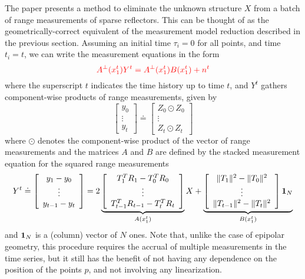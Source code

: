 \documentclass[]{article}
\newcommand{\ba}{\left[ \begin{array}}
\newcommand{\ea}{\end{array} \right]}
\begin{document}
The paper \cite{ferraraA09} presents a method to eliminate the unknown structure $X$ from a batch of range measurements of sparse reflectors. This can be thought of as the geometrically-correct equivalent of the measurement model reduction described in the previous section. Assuming an initial time $\tau_i = 0$ for all points, and time $t_i = t$, we can write the measurement equations in the form 
\begin{equation}
{\color{red}
A^\perp(x^t_1)Y^t = A^\perp(x_1^t) B(x_1^t) + n^t
}
\end{equation}
where the superscript $t$ indicates the time history up to time $t$, and $Y^t$ gathers component-wise products of range measurements, given by
\begin{equation}
\ba{c}
y_0 \\  \vdots \\ y_t \ea  \doteq  
\ba{c} 
Z_0 \odot Z_0  \\ 
\vdots \\ 
Z_t \odot Z_t \ea
\end{equation}
where $\odot$ denotes the component-wise product of the vector of range measurements and the matrices $A$ and $B$ are defined by the stacked measurement equation for the squared range measurements 
\begin{equation}
Y^t \doteq \ba{c}
y_1 -y_0 \\  \vdots \\ y_{t-1} - y_t \ea  
= 2
\underbrace{\ba{c}
T_1^T R_1 - T_0^T R_0 \\
\vdots \\
T_{t-1}^T R_{t-1} - T_t^T R_t
\ea}_{A(x_1^t)} X + 
\underbrace{\ba{c}
\| T_1 \|^2 - \| T_0 \|^2 \\
\vdots \\ 
\| T_{t-1} \|^2- \| T_t \|^2 
\ea {\bf 1}_N}_{B(x_1^t)}
\end{equation}
and ${\bf 1}_N$ is a (column) vector of $N$ ones. Note that, unlike the case of epipolar geometry, this procedure requires the accrual of multiple measurements in the time series, but it still has the benefit of not having any dependence on the position of the points $p$, and not involving any linearization.

 \begin{figure}[htb]
\begin{center}
~%
\end{center}
\caption{\sl }
\label{fig-}
\end{figure}
\end{document}
